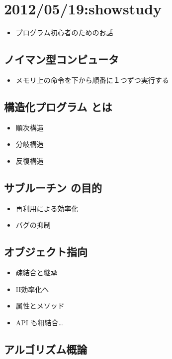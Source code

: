 \documentclass{jsarticle}
\begin{document}
\section{2012/05/19:showstudy}

\begin{itemize}
\item
  プログラム初心者のためのお話
\end{itemize}
\subsection{ノイマン型コンピュータ}

\begin{itemize}
\item
  メモリ上の命令を下から順番に１つずつ実行する
\end{itemize}
\subsection{構造化プログラム とは}

\begin{itemize}
\item
  順次構造
\item
  分岐構造
\item
  反復構造
\end{itemize}
\subsection{サブルーチン の目的}

\begin{itemize}
\item
  再利用による効率化
\item
  バグの抑制
\end{itemize}
\subsection{オブジェクト指向}

\begin{itemize}
\item
  疎結合と継承
\item
  II効率化へ
\item
  属性とメソッド
\item
  API も粗結合\ldots{}
\end{itemize}
\subsection{アルゴリズム概論}
\end{document}
